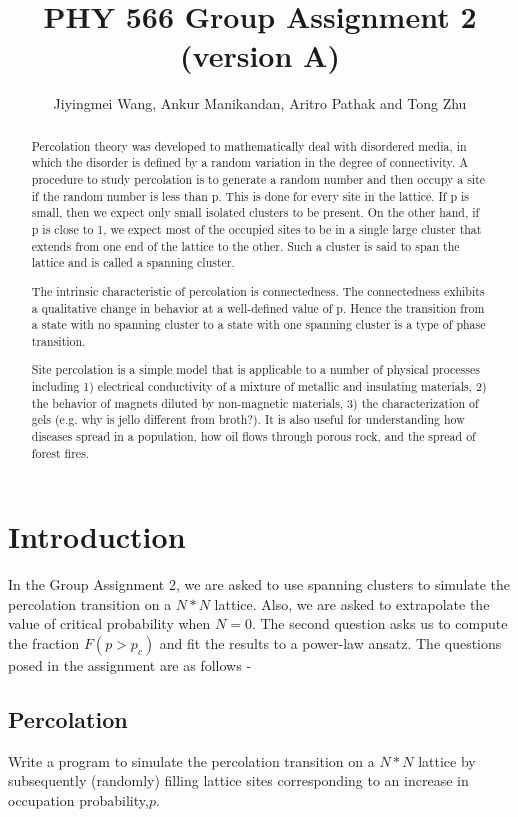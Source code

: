 \documentclass[11pt, oneside]{article}   	%
\title{PHY 566 Group Assignment 2 (version A) }
\author{Jiyingmei Wang, Ankur Manikandan, Aritro Pathak and Tong Zhu}
\begin{document}
\maketitle

\begin{abstract}
Percolation theory was developed to mathematically deal with disordered media, in which the disorder is defined by a random variation in the degree of connectivity. A procedure to study percolation is to generate a random number and then occupy a site
if the random number is less than p. This is done for every site in the lattice. If p is small, then we expect only small isolated clusters to be present. On the other hand, if p is close to 1, we expect most of the occupied sites to be in a single large cluster that extends from one end of the lattice to the other. Such a cluster is said to span the lattice and is called a spanning cluster. 

The intrinsic characteristic of percolation is connectedness. The connectedness exhibits a qualitative change in behavior at a well-defined value of p. Hence the transition from a state with no spanning cluster to a state with one spanning cluster is a type of phase
transition.

 Site percolation is a simple model that is applicable to a number of physical processes including 1) electrical conductivity of a mixture of metallic and insulating materials, 2) the behavior of magnets diluted by non-magnetic materials, 3) the characterization of gels (e.g. why is jello different from broth?). It is also useful for understanding how diseases spread in a population, how oil flows through porous rock, and the spread of forest fires. 
\end{abstract}

\section{Introduction}
In the Group Assignment 2, we are asked to use spanning clusters to simulate the percolation transition on a $N * N$ lattice. Also, we are asked to extrapolate the value of critical probability when $N=0$. The second question asks us to compute the fraction $F(p>p_c)$ and fit the results to a power-law ansatz. The questions posed in the assignment are as follows - 

\subsection{Percolation}
Write a program to simulate the percolation transition on a $N*N$ lattice by subsequently (randomly) filling lattice sites corresponding to an increase in occupation probability,$ p$.
\end{document}
